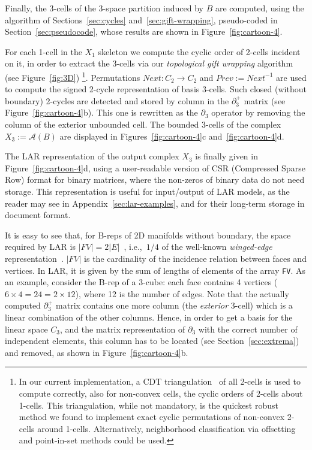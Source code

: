 Finally, the 3-cells of the 3-space partition induced by $B$ are computed, using the algorithm of Sections~\ref{sec:cycles} and~\ref{sec:gift-wrapping}, pseudo-coded in Section~\ref{sec:pseudocode},  whose results are shown in Figure~\ref{fig:cartoon-4}. 

{For each 1-cell in the $X_1$ skeleton we compute the cyclic order of 2-cells incident on it, in order to extract the 3-cells via our \emph{topological gift wrapping} algorithm (see Figure~\ref{fig:3D})}
\footnote{{In our current implementation, a CDT triangulation~\cite{Shewchuk2008} of all 2-cells is used to compute correctly, also for non-convex cells, the cyclic orders of 2-cells about 1-cells. This triangulation, while  not mandatory, is the quickest robust method we found to implement exact cyclic permutations of non-convex 2-cells around 1-cells. Alternatively, neighborhood classification via offsetting and point-in-set methods could be used.}}. Permutations $\mathit{Next}: C_2\to C_2$ and $\mathit{Prev} := \mathit{Next}^{-1}$ are used to compute the signed 2-cycle representation of basis 3-cells. Such closed (without boundary) 2-cycles are detected and stored  by column in the $\partial_3^+$ matrix (see Figure~\ref{fig:cartoon-4}b). 
This one is rewritten as the $\partial_3$ operator by removing the column of the exterior {unbounded} cell.
The {bounded} 3-cells of the complex $X_3 := \mathcal{A}(B)$ are displayed in {Figures~\ref{fig:cartoon-4}c and~\ref{fig:cartoon-4}d.}

The LAR representation of the output complex $X_3$ is finally given in Figure~\ref{fig:cartoon-4}d, using a user-readable version of CSR (Compressed Sparse Row) format for binary matrices, where the non-zeros of binary data do not need storage.  This representation is useful for input/output of LAR models, as the reader may see in Appendix~\ref{sec:lar-examples},  and for their long-term storage in document format. 

{It is easy to see that, for  B-reps of 2D manifolds without boundary}, the space required by LAR is {$|FV| = 2|E|$}~\cite{woo:85}, i.e.,~$1/4$ of the well-known \emph{winged-edge} representation~\cite{Baumgart:1972:WEP:891970}. {$|FV|$ is the cardinality of the incidence relation between faces and vertices. In LAR, it is given by the sum of lengths of elements of the array \texttt{FV}. As an example, consider the B-rep of a 3-cube: each face contains 4 vertices ($6\times 4 = 24 = 2\times 12$), where 12 is the number of edges. }
Note that the actually computed $\partial^+_3$ matrix contains one more column (the \emph{exterior} 3-cell) which is a linear combination of the other columns. {Hence,} in order to get a basis for the linear space $C_3$, and {the matrix representation of $\partial_3$ with the correct number of independent elements}, this column has to be located (see Section~\ref{sec:extrema}) and removed, as shown in Figure~\ref{fig:cartoon-4}b.  

